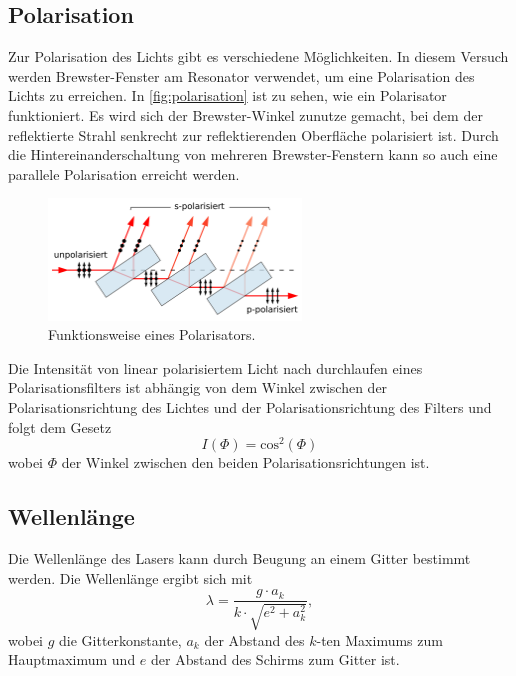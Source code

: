 \subsection{Polarisation}\label{sec:polarisation}
Zur Polarisation des Lichts gibt es verschiedene Möglichkeiten. In diesem Versuch werden Brewster-Fenster am Resonator verwendet, um eine Polarisation des Lichts zu erreichen.
In \autoref{fig:polarisation} ist zu sehen, wie ein Polarisator funktioniert. Es wird sich der Brewster-Winkel zunutze gemacht, bei dem der reflektierte Strahl senkrecht zur reflektierenden
Oberfläche polarisiert ist. Durch die Hintereinanderschaltung von mehreren Brewster-Fenstern kann so auch eine parallele Polarisation erreicht werden.
\begin{figure}[H]
    \centering
    \includegraphics[width=0.6\textwidth]{grafiken/brewster.png}
    \caption{Funktionsweise eines Polarisators.\cite{brewster}}
    \label{fig:polarisation}
\end{figure}
\noindent
Die Intensität von linear polarisiertem Licht nach durchlaufen eines Polarisationsfilters ist abhängig von dem Winkel zwischen der Polarisationsrichtung des Lichtes und der Polarisationsrichtung des Filters und folgt dem Gesetz
\begin{equation}
    \label{eqn:pol}
    I\left(\Phi\right) = \text{cos}^2\left( \Phi \right)
\end{equation}
wobei $\Phi$ der Winkel zwischen den beiden Polarisationsrichtungen ist.
\subsection{Wellenlänge}\label{sec:wellenlaenge}
Die Wellenlänge des Lasers kann durch Beugung an einem Gitter bestimmt werden. Die Wellenlänge ergibt sich mit
\begin{equation*}
    \label{eqn:wel}
    \lambda = \frac{g \cdot a_k}{k \cdot \sqrt{e^2 + a_k^2}},
\end{equation*}
wobei $g$ die Gitterkonstante, $a_k$ der Abstand des $k$-ten Maximums zum Hauptmaximum und $e$ der Abstand des Schirms zum Gitter ist.\\
\newpage
